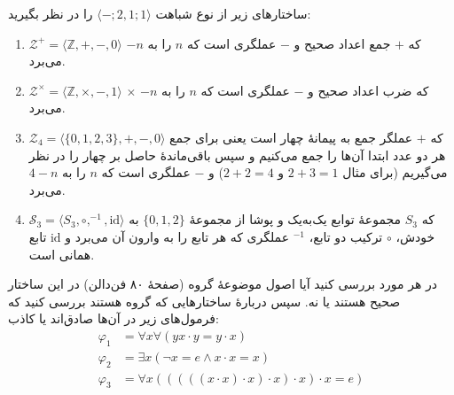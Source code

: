 ساختارهای زیر از نوع شباهت
$\langle\mathord{-};2,1;1\rangle$
را در نظر بگیرید:
\begin{enumerate}[label=(\alph*)]
    \item $\mathcal{Z^+}=\langle\mathbb{Z},+,-,0\rangle$
    که
    $+$ جمع اعداد صحیح و
    $-$ عملگری است که $n$ را به $-n$ می‌برد.
    \item $\mathcal{Z^\times}=\langle\mathbb{Z},\times,-, 1\rangle$
    $\times$ که ضرب اعداد صحیح و
    $-$ عملگری است که $n$ را به $-n$ می‌برد.
    \item $\mathcal{Z}_4=\langle\{0,1,2,3\},+,-, 0\rangle$
    که $+$ عملگر جمع به پیمانهٔ چهار است یعنی برای جمع هر دو عدد ابتدا آن‌ها را جمع می‌کنیم و سپس باقی‌ماندهٔ حاصل بر چهار را در نظر می‌گیریم
    (برای مثال
    $2+3=1$
    و
    $2+2=4$)
    و
    $-$
    عملگری است که $n$ را به $4-n$ می‌برد.
    \item $\mathcal{S}_3=\langle S_3, \circ,^{-1},\text{id}\rangle$
    که
    $S_3$
    مجموعهٔ توابع یک‌به‌یک و پوشا از مجموعهٔ
    $\{0,1,2\}$
    به خودش،
    $\circ$
    ترکیب دو تابع،
    $^{-1}$
    عملگری که هر تابع را به وارون آن می‌برد و
    $\text{id}$
    تابع همانی است.
\end{enumerate}
در هر مورد بررسی کنید آیا اصول موضوعهٔ گروه
(صفحهٔ ۸۰ فن‌دالن)
در این ساختار صحیح هستند یا نه. سپس دربارهٔ ساختارهایی که گروه هستند بررسی کنید که فرمول‌های زیر در آن‌ها صادق‌اند یا کاذب:
\begin{align*}
    \varphi_1 &= \forall x\forall (y x\cdot y = y\cdot x) \\
    \varphi_2 &= \exists x (\neg x = e \wedge x\cdot x = x) \\
    \varphi_3 &= \forall x (((((x\cdot x)\cdot x)\cdot x)\cdot x)\cdot x = e)
\end{align*}